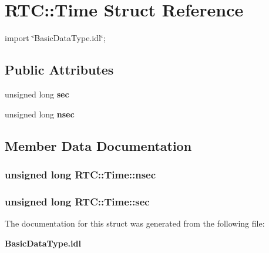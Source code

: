 \section{RTC::Time Struct Reference}
\label{structRTC_1_1Time}


{\ttfamily import \char`\"{}BasicDataType.idl\char`\"{};}

\subsection*{Public Attributes}
\begin{DoxyCompactItemize}
\item 
unsigned long {\bf sec}
\item 
unsigned long {\bf nsec}
\end{DoxyCompactItemize}


\subsection{Member Data Documentation}
\subsubsection[{nsec}]{\setlength{\rightskip}{0pt plus 5cm}unsigned long {\bf RTC::Time::nsec}}\label{structRTC_1_1Time_af90fdb43cc4cd394cc9e097e673821be}
\subsubsection[{sec}]{\setlength{\rightskip}{0pt plus 5cm}unsigned long {\bf RTC::Time::sec}}\label{structRTC_1_1Time_a1ed073c8e58d7465a571f839514d53a5}


The documentation for this struct was generated from the following file:\begin{DoxyCompactItemize}
\item 
{\bf BasicDataType.idl}\end{DoxyCompactItemize}
